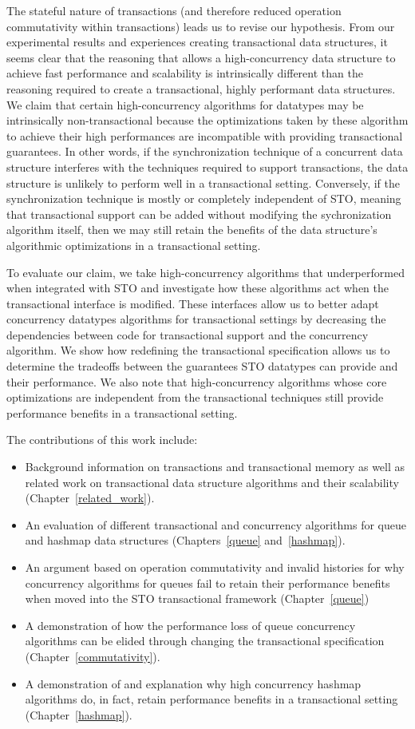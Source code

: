 The stateful nature of transactions (and therefore reduced operation commutativity within transactions) leads us to revise our hypothesis. From our experimental results and experiences creating transactional data structures, it seems clear that the reasoning that allows a high-concurrency data structure to achieve fast performance and scalability is intrinsically different than the reasoning required to create a transactional, highly performant data structures. 
We claim that certain high-concurrency algorithms for datatypes may be intrinsically non-transactional because the optimizations taken by these algorithm to achieve their high performances are incompatible with providing transactional guarantees. In other words, if the synchronization technique of a concurrent data structure interferes with the techniques required to support transactions, the data structure is unlikely to perform well in a transactional setting. Conversely, if the synchronization technique is mostly or completely independent of STO, meaning that transactional support can be added without modifying the sychronization algorithm itself, then we may still retain the benefits of the data structure's algorithmic optimizations in a transactional setting.

To evaluate our claim, we take high-concurrency algorithms that underperformed when integrated with STO and investigate how these algorithms act when the transactional interface is modified. These interfaces allow us to better adapt concurrency datatypes algorithms for transactional settings by decreasing the dependencies between code for transactional support and the concurrency algorithm.
We show how redefining the transactional specification allows us to determine the tradeoffs between the guarantees STO datatypes can provide and their performance. We also note that high-concurrency algorithms whose core optimizations are independent from the transactional techniques still provide performance benefits in a transactional setting.

The contributions of this work include: 
\begin{itemize}
    \item Background information on transactions and transactional memory as well as related work on transactional data structure algorithms and their scalability (Chapter~\ref{related_work}).
    \item An evaluation of different transactional and concurrency algorithms for queue and hashmap data structures (Chapters~\ref{queue} and~\ref{hashmap}).
    \item An argument based on operation commutativity and invalid histories for why concurrency algorithms for queues fail to retain their performance benefits when moved into the STO transactional framework (Chapter~\ref{queue})
    \item A demonstration of how the performance loss of queue concurrency algorithms can be elided through changing the transactional specification (Chapter~\ref{commutativity}).
    \item A demonstration of and explanation why high concurrency hashmap algorithms do, in fact, retain performance benefits in a transactional setting (Chapter~\ref{hashmap}).
\end{itemize}
